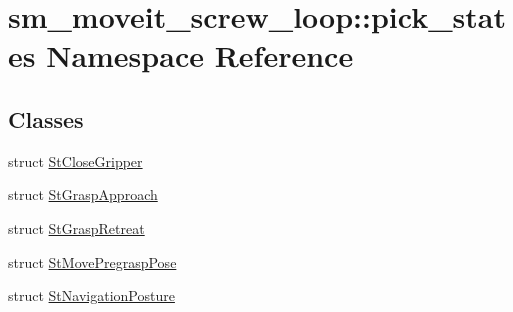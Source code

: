 \hypertarget{namespacesm__moveit__screw__loop_1_1pick__states}{}\section{sm\+\_\+moveit\+\_\+screw\+\_\+loop\+:\+:pick\+\_\+states Namespace Reference}
\label{namespacesm__moveit__screw__loop_1_1pick__states}
\subsection*{Classes}
\begin{DoxyCompactItemize}
\item 
struct \hyperlink{structsm__moveit__screw__loop_1_1pick__states_1_1StCloseGripper}{St\+Close\+Gripper}
\item 
struct \hyperlink{structsm__moveit__screw__loop_1_1pick__states_1_1StGraspApproach}{St\+Grasp\+Approach}
\item 
struct \hyperlink{structsm__moveit__screw__loop_1_1pick__states_1_1StGraspRetreat}{St\+Grasp\+Retreat}
\item 
struct \hyperlink{structsm__moveit__screw__loop_1_1pick__states_1_1StMovePregraspPose}{St\+Move\+Pregrasp\+Pose}
\item 
struct \hyperlink{structsm__moveit__screw__loop_1_1pick__states_1_1StNavigationPosture}{St\+Navigation\+Posture}
\end{DoxyCompactItemize}
